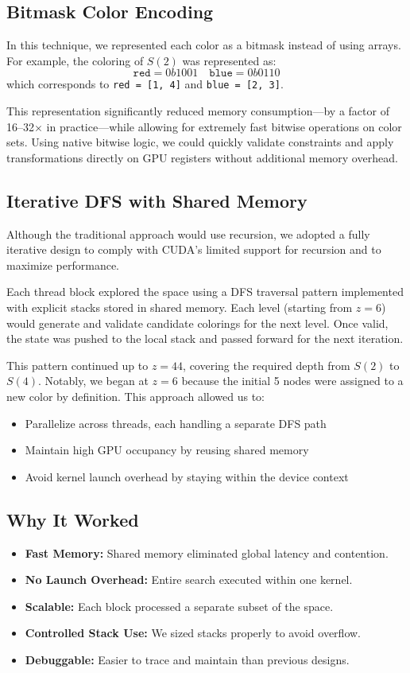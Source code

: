 \documentclass[12pt]{article}
\begin{document}
\subsection{Bitmask Color Encoding}
In this technique, we represented each color as a bitmask instead of using arrays. For example, the coloring of $S(2)$ was represented as:
\[
\texttt{red} = 0b1001 \quad \texttt{blue} = 0b0110
\]
which corresponds to \texttt{red = [1, 4]} and \texttt{blue = [2, 3]}.

This representation significantly reduced memory consumption—by a factor of 16--32$\times$ in practice—while allowing for extremely fast bitwise operations on color sets. Using native bitwise logic, we could quickly validate constraints and apply transformations directly on GPU registers without additional memory overhead.

\subsection{Iterative DFS with Shared Memory}
Although the traditional approach would use recursion, we adopted a fully iterative design to comply with CUDA's limited support for recursion and to maximize performance.

Each thread block explored the space using a DFS traversal pattern implemented with explicit stacks stored in shared memory. Each level (starting from $z = 6$) would generate and validate candidate colorings for the next level. Once valid, the state was pushed to the local stack and passed forward for the next iteration.

This pattern continued up to $z = 44$, covering the required depth from $S(2)$ to $S(4)$. Notably, we began at $z = 6$ because the initial 5 nodes were assigned to a new color by definition. This approach allowed us to:
\begin{itemize}
    \item Parallelize across threads, each handling a separate DFS path
    \item Maintain high GPU occupancy by reusing shared memory
    \item Avoid kernel launch overhead by staying within the device context
\end{itemize}




\subsection{Why It Worked}
\begin{itemize}
    \item \textbf{Fast Memory:} Shared memory eliminated global latency and contention.
    \item \textbf{No Launch Overhead:} Entire search executed within one kernel.
    \item \textbf{Scalable:} Each block processed a separate subset of the space.
    \item \textbf{Controlled Stack Use:} We sized stacks properly to avoid overflow.
    \item \textbf{Debuggable:} Easier to trace and maintain than previous designs.
\end{itemize}
\end{document}

